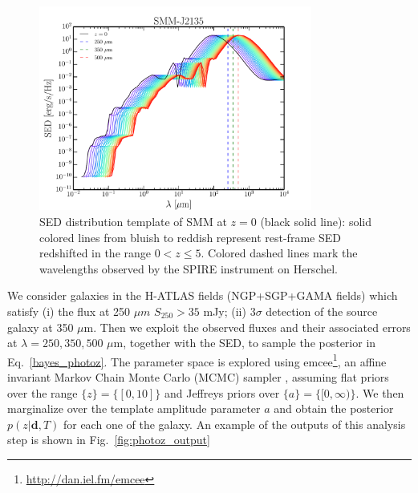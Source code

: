 \documentclass[prd,showpacs,amsfonts,amssymb,amsmath, nofootinbib]{revtex4-1}
\begin{document}
\begin{figure}[!th]
\begin{center}
\includegraphics[width=0.8\textwidth]{images/SED_zs}
\caption{SED distribution template of SMM at $z=0$ (black solid line): solid colored lines from bluish to reddish represent rest-frame SED redshifted in the range $0 < z \le 5$. Colored dashed lines mark the wavelengths observed by the SPIRE instrument on Herschel.} 
\label{fig:sed}
\end{center}
\end{figure}

We consider galaxies in the H-ATLAS fields (NGP+SGP+GAMA fields) which satisfy (i) the flux at 250 $\mu m$ $S_{250}> 35$ mJy; (ii) $3\sigma$ detection of the source galaxy at 350 $\mu$m. Then we exploit the observed fluxes and their associated errors at $\lambda=250,350,500$ $\mu$m, together with the SED, to sample the posterior in Eq.~\ref{bayes_photoz}. The parameter space is explored using emcee\footnote{\url{http://dan.iel.fm/emcee}}, an affine invariant Markov Chain Monte Carlo (MCMC) sampler \citep{emcee}, assuming flat priors over the range $\{z\} = \{[0,10]\}$ and Jeffreys priors over $\{a\} = \{[0,\infty)\}$. We then marginalize over the template amplitude parameter $a$ and obtain the posterior $p(z|\mathbf{d},T)$ for each one of the galaxy. An example of the outputs of this analysis step is shown in Fig.~\ref{fig:photoz_output}
\end{document}
